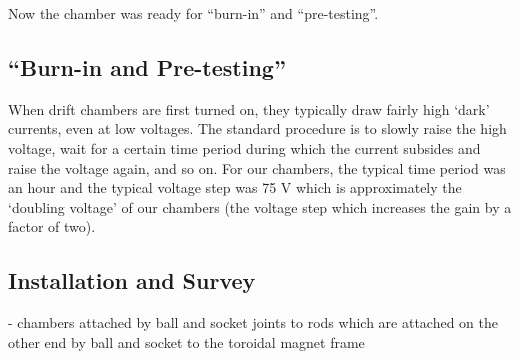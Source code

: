 Now the chamber was ready for ``burn-in'' and ``pre-testing''.

\subsection{``Burn-in and Pre-testing''}
When drift chambers are first turned on, they typically draw fairly high
`dark' currents, even at low voltages.  The standard procedure is to
slowly raise the high voltage, wait for a certain time period during
which the current subsides and raise the voltage again, and so on.
For our chambers, the typical time period was an hour and the typical
voltage step was 75 V which is approximately the `doubling voltage' of
our chambers (the voltage step which increases the gain by a factor
of two).

\subsection{Installation and Survey}
- chambers attached by ball and socket joints to rods which are attached
on the other end by ball and socket to the toroidal magnet frame

